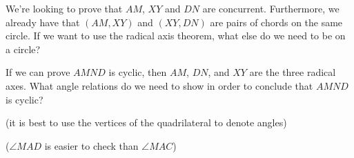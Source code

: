 







We're looking to prove that $AM$, $XY$ and $DN$ are concurrent. Furthermore, we already have that $(AM,XY)$ and $(XY,DN)$ are pairs of chords on the same circle. If we want to use the radical axis theorem, what else do we need to be on a circle?




If we can prove $AMND$ is cyclic, then $AM$, $DN$, and $XY$ are the three radical axes. What angle relations do we need to show in order to conclude that $AMND$ is cyclic?

(it is best to use the vertices of the quadrilateral to denote angles)

($\angle MAD$ is easier to check than $\angle MAC$)

